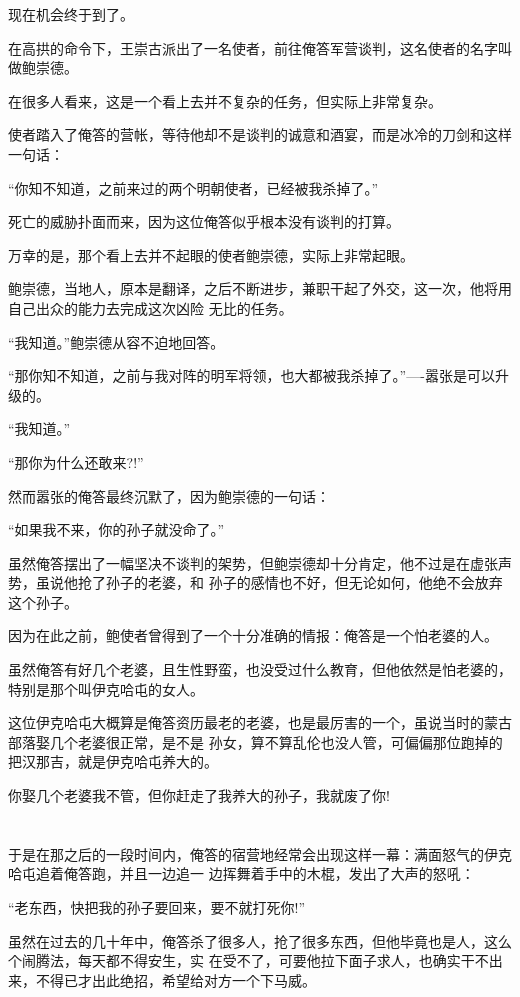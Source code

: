 \documentclass[11pt,a4paper,onecolumn]{article}
\begin{document}
现在机会终于到了。

在高拱的命令下，王崇古派出了一名使者，前往俺答军营谈判，这名使者的名字叫做鲍崇德。

在很多人看来，这是一个看上去并不复杂的任务，但实际上非常复杂。

使者踏入了俺答的营帐，等待他却不是谈判的诚意和酒宴，而是冰冷的刀剑和这样一句话：

``你知不知道，之前来过的两个明朝使者，已经被我杀掉了。''

死亡的威胁扑面而来，因为这位俺答似乎根本没有谈判的打算。

万幸的是，那个看上去并不起眼的使者鲍崇德，实际上非常起眼。

鲍崇德，当地人，原本是翻译，之后不断进步，兼职干起了外交，这一次，他将用自己出众的能力去完成这次凶险
无比的任务。

``我知道。''鲍崇德从容不迫地回答。

``那你知不知道，之前与我对阵的明军将领，也大都被我杀掉了。''----嚣张是可以升级的。

``我知道。''

``那你为什么还敢来?!''

然而嚣张的俺答最终沉默了，因为鲍崇德的一句话：

``如果我不来，你的孙子就没命了。''

虽然俺答摆出了一幅坚决不谈判的架势，但鲍崇德却十分肯定，他不过是在虚张声势，虽说他抢了孙子的老婆，和
孙子的感情也不好，但无论如何，他绝不会放弃这个孙子。

因为在此之前，鲍使者曾得到了一个十分准确的情报：俺答是一个怕老婆的人。

虽然俺答有好几个老婆，且生性野蛮，也没受过什么教育，但他依然是怕老婆的，特别是那个叫伊克哈屯的女人。

这位伊克哈屯大概算是俺答资历最老的老婆，也是最厉害的一个，虽说当时的蒙古部落娶几个老婆很正常，是不是
孙女，算不算乱伦也没人管，可偏偏那位跑掉的把汉那吉，就是伊克哈屯养大的。

你娶几个老婆我不管，但你赶走了我养大的孙子，我就废了你!

\section[\thesection]{}

于是在那之后的一段时间内，俺答的宿营地经常会出现这样一幕：满面怒气的伊克哈屯追着俺答跑，并且一边追一
边挥舞着手中的木棍，发出了大声的怒吼：

``老东西，快把我的孙子要回来，要不就打死你!''

虽然在过去的几十年中，俺答杀了很多人，抢了很多东西，但他毕竟也是人，这么个闹腾法，每天都不得安生，实
在受不了，可要他拉下面子求人，也确实干不出来，不得已才出此绝招，希望给对方一个下马威。
\end{document}
